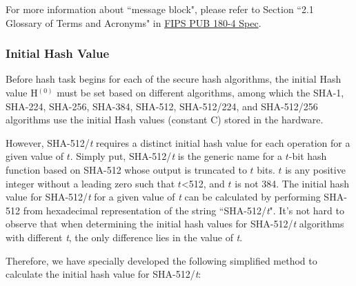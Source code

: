 \documentclass[main\_\_EN.tex]{subfiles}
\begin{document}
\begin{tiplisting}
\vspace{-0.5em}
For more information about ``message block", please refer to Section ``2.1 Glossary of Terms and Acronyms" in \href{https://doi.org/10.6028/NIST.FIPS.180-4}{FIPS PUB 180-4 Spec}.
\end{tiplisting}

\subsubsection{Initial Hash Value}\label{sec:sha-set-initial-hash}
Before hash task begins for each of the secure hash algorithms, the initial Hash value H$^{(0)}$ must be set based on different algorithms, among which the SHA-1, SHA-224, SHA-256, SHA-384, SHA-512, SHA-512/224, and SHA-512/256 algorithms use the initial Hash values (constant C) stored in the hardware.

However, SHA-512/{\it{t}} requires a distinct initial hash value for each operation for a given value of \begin{math}t\end{math}. Simply put, SHA-512/{\it{t}} is the generic name for a \begin{math}t\end{math}-bit hash function based on SHA-512 whose output is truncated to \begin{math}t\end{math} bits. \begin{math}t\end{math} is any positive integer without a leading zero such that \begin{math}t\end{math}<512, and \begin{math}t\end{math} is not 384. The initial hash value for SHA-512/{\it{t}} for a given value of {\it{t}} can be calculated by performing SHA-512 from hexadecimal representation of the string ``SHA-512/{\it{t}}". It's not hard to observe that when determining the initial hash values for SHA-512/{\it{t}} algorithms with different {\it{t}}, the only difference lies in the value of {\it{t}}.

Therefore, we have specially developed the following simplified method to calculate the initial hash value for SHA-512/{\it{t}}:
\end{document}

